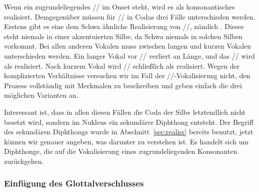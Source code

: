 \begin{exe}
  \ex\label{ex:phol9906}
  \begin{xlist}
  \end{xlist}
\end{exe}

Wenn ein zugrundeliegendes // im Onset steht, wird es als konsonantisches \textipa{[K]} realisiert.
Demgegenüber müssen für // in Codas drei Fälle unterschieden werden.
Erstens gibt es eine dem Schwa ähnliche Realisierung von //, nämlich \textipa{[5]}.
Dieses steht niemals in einer akzentuierten Silbe, da Schwa niemals in solchen Silben vorkommt.
Bei allen anderen Vokalen muss zwischen langen und kurzen Vokalen unterschieden werden.
Ein langer Vokal vor // verliert an Länge, und das // wird als \textipa{[5]} realisiert.
Nach kurzem Vokal wird // schließlich als \textipa{[@]} realisiert.
Wegen der komplizierten Verhältnisse versuchen wir im Fall der //-Vokalisierung nicht, den Prozess vollständig mit Merkmalen zu beschreiben und geben einfach die drei möglichen Varianten an.


Interessant ist, dass in allen diesen Fällen die Coda der Silbe letztendlich nicht besetzt wird, sondern im Nukleus ein sekundärer Diphthong entsteht.
Der Begriff des sekundären Diphthongs wurde in Abschnitt~\ref{sec:realisr} bereits benutzt, jetzt können wir genauer angeben, was darunter zu verstehen ist.
Es handelt sich um Diphthonge, die auf die Vokalisierung eines zugrundeliegenden Konsonanten zurückgehen.

\subsubsection{Einfügung des Glottalverschlusses}

